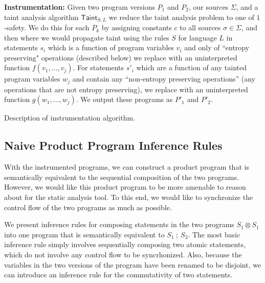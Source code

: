 \documentclass[letterpaper,twocolumn,10pt]{article}
\newcommand{\cross}{\otimes{}}
\begin{document}
\textbf{Instrumentation:} Given two program versions $P_1$ and $P_2$, our sources $\Sigma$, and a taint analysis algorithm $\mathsf{Taint}_{S,L}$
     we reduce the taint analysis problem to one of $1$-safety.
    We do this for each $P_k$ by assigning constants $c$ to all sources $\sigma \in \Sigma$, and then where we would propagate taint using the rules $S$ for language $L$
    in statements $s_i$ which is a function of program variables $v_i$ and only of ``entropy preserving" operations (described below) 
    we replace with an uninterpreted function $f(v_1, \ldots, v_j)$. For statements $s'_i$ which are a
    function of any tainted program variables $w_j$ and contain any ``non-entropy preserving operations'' (any operations that are not entropy preserving), we replace
    with an uninterpreted function $g(w_1, \ldots, w_j)$. We output these programs as $P'_1$ and $P'_2$.

Description of instrumentation algorithm.

\subsection{Naive Product Program Inference Rules}

With the instrumented programs, we can construct a product program that is semantically equivalent to the sequential composition of the two programs. However, we would like this product program to be more amenable to reason about for the static analysis tool. To this end, we would like to synchronize the control flow of the two programs as much as possible. 

We present inference rules for composing statements in the two programs $S_1 \cross S_1$ into one program that is semantically equivalent to $S_1\ ;\ S_2$. The most basic inference rule simply involves sequentially composing two atomic statements, which do not involve any control flow to be syncrhonized. Also, because the variables in the two versions of the program have been renamed to be disjoint, we can introduce an inference rule for the commutativity of two statements.  
\end{document}
